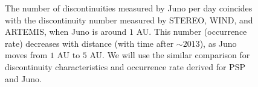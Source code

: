 \documentclass[
  letterpaper,
  DIV=11,
  numbers=noendperiod]{scrartcl}
\begin{document}
\begin{figure}


\caption{\label{fig-rate}The number of discontinuities measured by Juno per day coincides with the discontinuity number measured by STEREO, WIND, and ARTEMIS, when Juno is around \(1\) AU. This number (occurrence rate) decreases with distance (with time after \(\sim 2013\)), as Juno moves from \(1\) AU to \(5\) AU. We will use the similar comparison for discontinuity characteristics and occurrence rate derived for PSP and Juno.}

\end{figure}%
\end{document}
